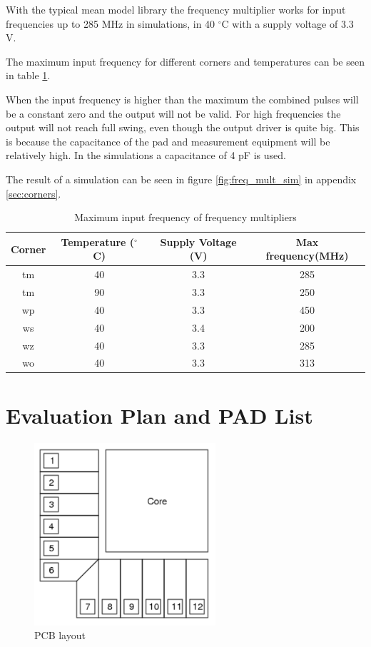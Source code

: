 \documentclass[a4paper,12pt]{article} \usepackage{graphicx}
\newcommand{\degree}{\ensuremath{^\circ}}
\begin{document}
With the typical mean model library the frequency multiplier works for
input frequencies up to 285 MHz in simulations, in 40 \degree C with a supply
voltage of 3.3 V.

The maximum input frequency for different corners and temperatures can be seen
in table \ref{tab:freq_mult}.

When the input frequency is higher than the maximum the combined pulses will be
a constant zero and the output will not be valid. For high frequencies the
output will not reach full swing, even though the output driver is quite big.
This is because the capacitance of the pad and measurement equipment will be
relatively high. In the simulations a capacitance of 4 pF is used.

The result of a simulation can be seen in figure \ref{fig:freq_mult_sim} in appendix
\ref{sec:corners}.
\begin{table}[h]
        \centering
        \begin{tabular}{|c|c|c|c|}
                \hline
        \textbf{Corner} & \textbf{Temperature (\degree C)} &
        \textbf{Supply Voltage (V)} & \textbf{Max frequency(MHz)} \\
        \hline
        tm & 40 & 3.3 & 285 \\
        tm & 90 & 3.3 & 250 \\
        wp & 40 & 3.3 & 450 \\
        ws & 40 & 3.4 & 200 \\
        wz & 40 & 3.3 & 285 \\
        wo & 40 & 3.3 & 313 \\

        \hline
\end{tabular}
\caption{Maximum input frequency of frequency multipliers}
\label{tab:freq_mult}
\end{table}

\newpage
\section{Evaluation Plan and PAD List}

\begin{figure} [h!]
\centering
\includegraphics[width=0.6\textwidth]{../Bilder/Layout/PCB.png}
\caption{PCB layout}
\label{fig:PCB}
\end{figure}
\end{document}
